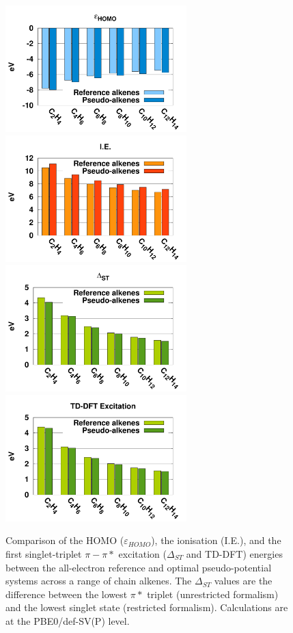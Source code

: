 \documentclass[aip]{revtex4-1}
\begin{document}
\begin{figure}
\begin{center}
\includegraphics[width=7cm]{short_pbe0_homo}
\includegraphics[width=7cm]{short_pbe0_ie}
\includegraphics[width=7cm]{short_pbe0_st}
\includegraphics[width=7cm]{short_pbe0_tddft}
\end{center}
\caption{Comparison of the HOMO ($\varepsilon_{HOMO}$),
the ionisation (I.E.), and
the first singlet-triplet $\pi-\pi*$ excitation ($\Delta_{ST}$ and TD-DFT) energies
between the
all-electron reference and optimal pseudo-potential systems across a range of chain alkenes.
The $\Delta_{ST}$ values are the difference
between the lowest $\pi*$ triplet (unrestricted formalism) and the lowest singlet state
(restricted formalism).
Calculations are at the PBE0/def-SV(P) level.}
\label{fig:alkenes_pbe0_dft}
\end{figure}
\end{document}
